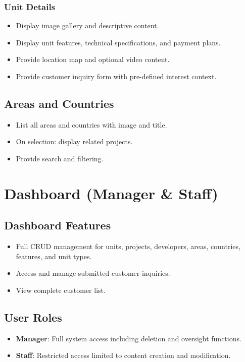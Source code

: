 \documentclass[12pt]{article}
\begin{document}
\subsubsection{Unit Details}
\begin{itemize}
    \item Display image gallery and descriptive content.
    \item Display unit features, technical specifications, and payment plans.
    \item Provide location map and optional video content.
    \item Provide customer inquiry form with pre-defined interest context.
\end{itemize}

\subsection{Areas and Countries}
\begin{itemize}
    \item List all areas and countries with image and title.
    \item On selection: display related projects.
    \item Provide search and filtering.
\end{itemize}

\section{Dashboard (Manager \& Staff)}

\subsection{Dashboard Features}
\begin{itemize}
    \item Full CRUD management for units, projects, developers, areas, countries, features, and unit types.
    \item Access and manage submitted customer inquiries.
    \item View complete customer list.
\end{itemize}

\subsection{User Roles}
\begin{itemize}
    \item \textbf{Manager}: Full system access including deletion and oversight functions.
    \item \textbf{Staff}: Restricted access limited to content creation and modification.
\end{itemize}
\end{document}
